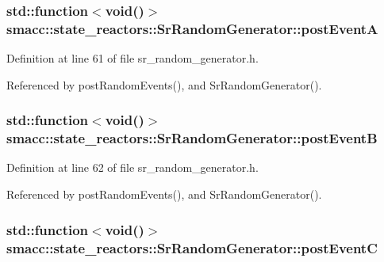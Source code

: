 \subsubsection[{\texorpdfstring{post\+EventA}{postEventA}}]{\setlength{\rightskip}{0pt plus 5cm}std\+::function$<$void()$>$ smacc\+::state\+\_\+reactors\+::\+Sr\+Random\+Generator\+::post\+EventA\hspace{0.3cm}{\ttfamily [private]}}\hypertarget{classsmacc_1_1state__reactors_1_1SrRandomGenerator_ac157de4b848ebc5da1acb593f7b25108}{}\label{classsmacc_1_1state__reactors_1_1SrRandomGenerator_ac157de4b848ebc5da1acb593f7b25108}


Definition at line 61 of file sr\+\_\+random\+\_\+generator.\+h.



Referenced by post\+Random\+Events(), and Sr\+Random\+Generator().

\subsubsection[{\texorpdfstring{post\+EventB}{postEventB}}]{\setlength{\rightskip}{0pt plus 5cm}std\+::function$<$void()$>$ smacc\+::state\+\_\+reactors\+::\+Sr\+Random\+Generator\+::post\+EventB\hspace{0.3cm}{\ttfamily [private]}}\hypertarget{classsmacc_1_1state__reactors_1_1SrRandomGenerator_a0b38db23bf80e0709c2ae51c6a64ac1c}{}\label{classsmacc_1_1state__reactors_1_1SrRandomGenerator_a0b38db23bf80e0709c2ae51c6a64ac1c}


Definition at line 62 of file sr\+\_\+random\+\_\+generator.\+h.



Referenced by post\+Random\+Events(), and Sr\+Random\+Generator().

\subsubsection[{\texorpdfstring{post\+EventC}{postEventC}}]{\setlength{\rightskip}{0pt plus 5cm}std\+::function$<$void()$>$ smacc\+::state\+\_\+reactors\+::\+Sr\+Random\+Generator\+::post\+EventC\hspace{0.3cm}{\ttfamily [private]}}\hypertarget{classsmacc_1_1state__reactors_1_1SrRandomGenerator_a1aeb07de7b52a9f5811e5f60444731a0}{}\label{classsmacc_1_1state__reactors_1_1SrRandomGenerator_a1aeb07de7b52a9f5811e5f60444731a0}


